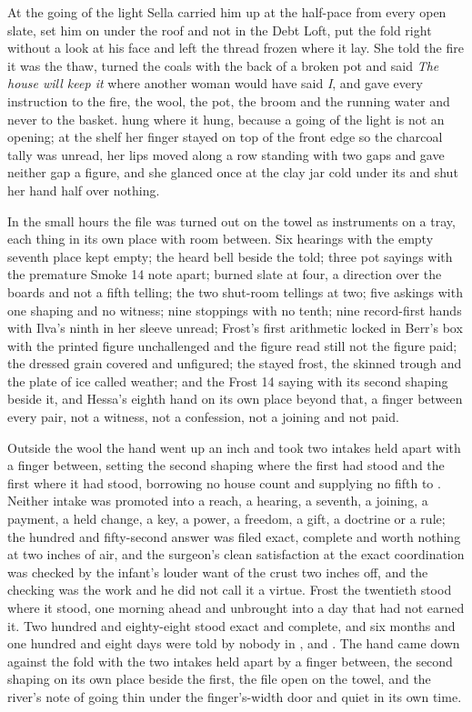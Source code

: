 \scenebreak

At the going of the light Sella carried him up at the half-pace from every open slate, set him on  under the roof and not in the Debt Loft, put the fold right without a look at his face and left the thread frozen where it lay. She told the fire it was the thaw, turned the coals with the back of a broken pot and said \emph{The house will keep it} where another woman would have said \emph{I}, and gave every instruction to the fire, the wool, the pot, the broom and the running water and never to the basket.  hung where it hung, because a going of the light is not an opening; at the shelf her finger stayed on top of the front edge so the charcoal tally was unread, her lips moved along a row standing with two gaps and gave neither gap a figure, and she glanced once at the clay jar cold under its  and shut her hand half over nothing.

In the small hours the file was turned out on the towel as instruments on a tray, each thing in its own place with room between. Six hearings with the empty seventh place kept empty; the heard bell beside the told; three pot sayings with the premature Smoke 14 note apart; burned slate at four, a direction over the boards and not a fifth telling; the two shut-room tellings at two; five askings with one shaping and no witness; nine stoppings with no tenth; nine record-first hands with Ilva's ninth in her sleeve unread; Frost's first arithmetic locked in Berr's box with the printed figure unchallenged and the figure read still not the figure paid; the dressed grain covered and unfigured; the stayed frost, the skinned trough and the plate of ice called weather; and the Frost 14 saying with its second shaping beside it, and Hessa's eighth hand on its own place beyond that, a finger between every pair, not a witness, not a confession, not a joining and not paid.

Outside the wool the hand went up an inch and took two intakes held apart with a finger between, setting the second shaping where the first had stood and the first where it had stood, borrowing no house count and supplying no fifth to . Neither intake was promoted into a reach, a hearing, a seventh, a joining, a payment, a held change, a key, a power, a freedom, a gift, a doctrine or a rule; the hundred and fifty-second answer was filed exact, complete and worth nothing at two inches of air, and the surgeon's clean satisfaction at the exact coordination was checked by the infant's louder want of the crust two inches off, and the checking was the work and he did not call it a virtue. Frost the twentieth stood where it stood, one morning ahead and unbrought into a day that had not earned it. Two hundred and eighty-eight stood exact and complete, and six months and one hundred and eight days were told by nobody in ,  and . The hand came down against the fold with the two intakes held apart by a finger between, the second shaping on its own place beside the first, the file open on the towel, and the river's note of  going thin under the finger's-width door and quiet in its own time.
